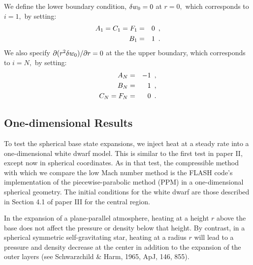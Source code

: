 We define the lower boundary condition, $ \delta w_0 = 0$ at $r=0,$ which
corresponds to $i=1,$ by setting:
\begin{eqnarray}
A_1 = C_1 = F_1 &=& 0\enskip, \nonumber \\
B_1 &=& 1\enskip. \nonumber
\end{eqnarray}
We also specify $\partial (r^2 \delta w_0) / \partial r = 0$ at the the upper boundary, which corresponds to $i=N,$
by setting:
\begin{eqnarray}
A_N &=& -1\enskip, \nonumber \\
B_N &=&  1\enskip, \nonumber \\
C_N = F_N &=& 0\enskip. \nonumber
\end{eqnarray}

\subsection{One-dimensional Results}

To test the spherical base state expansions, we inject heat at a
steady rate into a one-dimensional white dwarf model.  This is similar
to the first test in paper II, except now in spherical coordinates.
As in that test, the compressible method with which we compare the low Mach number method 
is the FLASH code's implementation of the
piecewise-parabolic method (PPM) in a one-dimensional spherical geometry.  
The initial conditions for the white dwarf are those described in
Section 4.1 of paper III for the central region.


In the expansion of a plane-parallel atmosphere, heating at a
height $r$ above the base does not affect the pressure or density 
below that height.  By contrast, in a spherical symmetric
self-gravitating star, heating at a radius $r$ will lead to a pressure
and density decrease at the center in addition to the expansion of the
outer layers (see Schwarzchild \& Harm, 1965, ApJ, 146, 855).


